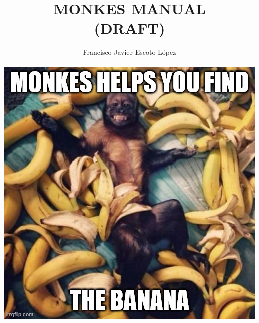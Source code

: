 \documentclass[twoside,11pt,english2 ]{article}
\title{\huge \textsc{MONKES MANUAL} \\ (DRAFT) }
\author{Francisco Javier Escoto L\'opez\\ \\ \includegraphics[scale=0.65]{figures/8i7h5z}}
\date{}
\begin{document}
 
	\maketitle

\newpage
\tableofcontents

\newcommand{\uu}{\vb*{u}}
\newcommand{\vv}{\vb*{v}}
\newcommand{\ww}{\vb*{w}}
\newcommand{\zz}{\vb*{z}}
\newcommand{\FF}{\vb*{F}}
\newcommand{\GG}{\vb*{G}}
\newcommand{\HH}{\vb*{H}}	
\newcommand{\OO}{\mathcal{O}}
%

\newcommand{\fix}[1]{\mbox{fix}\left(#1\right)}
\newcommand{\MONKES}{\texttt{MONKES}}
\newcommand{\per}[1]{\mbox{per}\left(#1\right)}
 
 \newpage
  
 
 
 
 
 
 \appendix 
  
 
 \printbibliography
\end{document}

